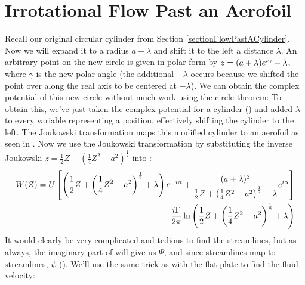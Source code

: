 \documentclass[12pt]{book}
\begin{document}
\section{Irrotational Flow Past an Aerofoil}\label{12834612837451289357239485610234}
Recall our original circular cylinder from Section \ref{sectionFlowPastACylinder}.  Now we will expand it to a radius $a+\lambda$ and shift it to the left a distance $\lambda$. An arbitrary point on the new circle is given in polar form by $z = (a+\lambda)e^{i\gamma}-\lambda$, where $\gamma$ is the new polar angle (the additional $-\lambda$ occurs because we shifted the point over along the real axis to be centered at $-\lambda$).  We can obtain the complex potential of this new circle without much work using the circle theorem:
To obtain this, we've just taken the complex potential for a cylinder () and added $\lambda$ to every variable representing a position, effectively shifting the cylinder to the left.  The Joukowski transformation maps this modified cylinder to an aerofoil as seen in .
Now we use the Joukowski transformation by substituting the inverse Joukowski $z=\frac{1}{2}Z+\left(\frac{1}{4}Z^2 - a^2\right)^{\frac{1}{2}}$ into :
\begin{equation}
\begin{split}
W(Z) = U\left[\left(\frac{1}{2}Z+\left(\frac{1}{4}Z^2 - a^2\right)^{\frac{1}{2}}+\lambda\right)e^{-i\alpha} + \frac{(a+\lambda)^2}{\frac{1}{2}Z+\left(\frac{1}{4}Z^2 - a^2\right)^{\frac{1}{2}}+\lambda}e^{i\alpha}\right] \\ - \frac{i\Gamma}{2\pi}\ln\left(\frac{1}{2}Z+\left(\frac{1}{4}Z^2 - a^2\right)^{\frac{1}{2}}+\lambda\right)
\end{split}
\label{90q2836129836749182356491823769281476592387465918276}
\end{equation}
It would clearly be very complicated and tedious to find the streamlines, but as always, the imaginary part of  will give us $\Psi$, and since streamlines map to streamlines,  $\psi$ ().  We'll use the same trick as with the flat plate to find the fluid velocity:
\end{document}
